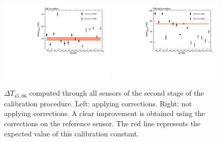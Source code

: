 \begin{figure}[htbp]
\centering
{\includegraphics[width=0.49\textwidth]{images/figure_15_a.pdf}}
{\includegraphics[width=0.49\textwidth]{images/figure_15_b.pdf}}
\caption{$\Delta T_{45,06}$ computed through all sensors of the second stage of the calibration procedure. Left: applying corrections. Right: not applying corrections. A clear improvement is obtained using the corrections on the reference sensor. The red line represents the expected value of this calibration constant.}
\label{fig:crosscheck}
\end{figure}